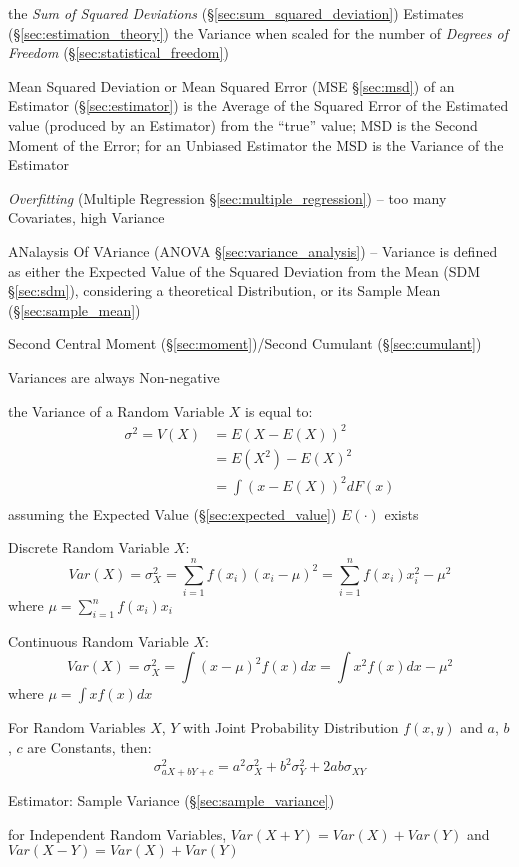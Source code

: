 the \emph{Sum of Squared Deviations} (\S\ref{sec:sum_squared_deviation})
Estimates (\S\ref{sec:estimation_theory}) the Variance when scaled for the
number of \emph{Degrees of Freedom} (\S\ref{sec:statistical_freedom})

\fist Mean Squared Deviation or Mean Squared Error (MSE \S\ref{sec:msd}) of an
Estimator (\S\ref{sec:estimator}) is the Average of the Squared Error of the
Estimated value (produced by an Estimator) from the ``true'' value; MSD is
the Second Moment of the Error; for an Unbiased Estimator the MSD is the
Variance of the Estimator

\emph{Overfitting} (Multiple Regression \S\ref{sec:multiple_regression}) -- too
many Covariates, high Variance

\fist ANalaysis Of VAriance (ANOVA \S\ref{sec:variance_analysis}) --
Variance is defined as either the Expected Value of the
Squared Deviation from the Mean (SDM \S\ref{sec:sdm}), considering a theoretical
Distribution, or its Sample Mean (\S\ref{sec:sample_mean})

Second Central Moment (\S\ref{sec:moment})/Second Cumulant
(\S\ref{sec:cumulant})

Variances are always Non-negative

the Variance of a Random Variable $X$ is equal to:
\begin{align*}
  \sigma^2 = V(X) & = E(X - E(X))^2   \\
                  & = E(X^2) - E(X)^2 \\
                  & = \int(x - E(X))^2 dF(x) \\
\end{align*}
assuming the Expected Value (\S\ref{sec:expected_value}) $E(\cdot)$ exists

Discrete Random Variable $X$:
\[
  Var(X) = \sigma_X^2 = \sum_{i=1}^n f(x_i) (x_i - \mu)^2 = \sum_{i=1}^n
  f(x_i) x_i^2 - \mu^2
\]
where $\mu = \sum_{i=1}^n f(x_i) x_i$

Continuous Random Variable $X$:
\[
  Var(X) = \sigma_X^2 = \int (x - \mu)^2 f(x) dx = \int x^2 f(x) dx -
  \mu^2
\]
where $\mu = \int x f(x) dx$

For Random Variables $X$, $Y$ with Joint Probability Distribution
$f(x,y)$ and $a$, $b$, $c$ are Constants, then:
\[
  \sigma^2_{a X + b Y + c} = a^2 \sigma^2_X + b^2 \sigma^2_Y + 2ab
  \sigma_{X Y}
\]

\fist Estimator: Sample Variance (\S\ref{sec:sample_variance})

for Independent Random Variables, $Var(X + Y) = Var(X) + Var(Y)$ and
$Var(X - Y) = Var(X) + Var(Y)$

